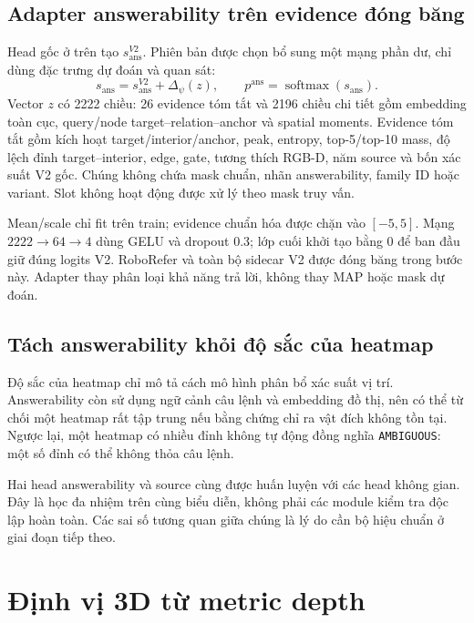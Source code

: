 \subsection{Adapter answerability trên evidence đóng băng}
\label{sec:method-answer-adapter}

Head gốc ở trên tạo $s_{\mathrm{ans}}^{V2}$. Phiên bản được chọn
bổ sung một mạng phần dư, chỉ dùng đặc trưng dự đoán và quan sát:
\begin{equation}
    s_{\mathrm{ans}}=s_{\mathrm{ans}}^{V2}+\Delta_\psi(z),
    \qquad p^{\mathrm{ans}}=\operatorname{softmax}(s_{\mathrm{ans}}).
    \label{eq:method-answer-adapter}
\end{equation}
Vector $z$ có 2222 chiều: 26 evidence tóm tắt và 2196 chiều chi tiết
gồm embedding toàn cục, query/node target--relation--anchor và spatial
moments. Evidence tóm tắt gồm kích hoạt target/interior/anchor,
peak, entropy, top-5/top-10 mass, độ lệch đỉnh target--interior,
edge, gate, tương thích RGB-D, năm source và bốn xác suất V2 gốc.
Chúng không chứa mask chuẩn, nhãn answerability, family ID hoặc variant.
Slot không hoạt động được xử lý theo mask truy vấn.

Mean/scale chỉ fit trên train; evidence chuẩn hóa được chặn vào
$[-5,5]$. Mạng $2222\rightarrow64\rightarrow4$ dùng GELU và dropout
0.3; lớp cuối khởi tạo bằng 0 để ban đầu giữ đúng logits V2.
RoboRefer và toàn bộ sidecar V2 được đóng băng trong bước này.
Adapter thay phân loại khả năng trả lời, không thay MAP hoặc mask dự đoán.

\subsection{Tách answerability khỏi độ sắc của heatmap}

Độ sắc của heatmap chỉ mô tả cách mô hình phân bổ xác suất vị trí.
Answerability còn sử dụng ngữ cảnh câu lệnh và embedding đồ thị,
nên có thể từ chối một heatmap rất tập trung nếu bằng chứng chỉ
ra vật đích không tồn tại. Ngược lại, một heatmap có nhiều đỉnh
không tự động đồng nghĩa \texttt{AMBIGUOUS}: một số đỉnh có thể
không thỏa câu lệnh.

Hai head answerability và source cùng được huấn luyện với các
head không gian. Đây là học đa nhiệm trên cùng biểu diễn, không
phải các module kiểm tra độc lập hoàn toàn.
Các sai số tương quan giữa chúng là lý do cần bộ hiệu chuẩn
ở giai đoạn tiếp theo.

\section{Định vị 3D từ metric depth}
\label{sec:method-3d}

